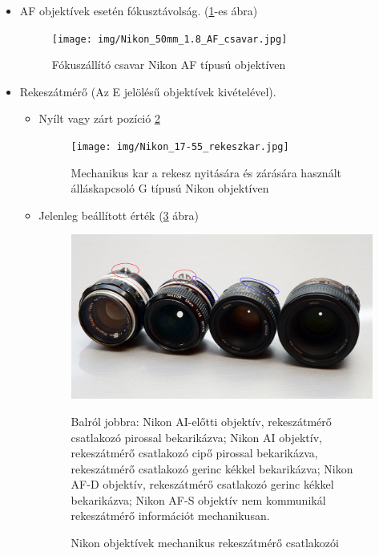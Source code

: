 \begin{itemize}
    \item AF objektívek esetén fókusztávolság. (\ref{fig:AF_csavar}-es ábra)
    \begin{figure}[H]
    	\centering
    	\texttt{[image: img/Nikon\_50mm\_1.8\_AF\_csavar.jpg]}
    	\caption{Fókuszállító csavar Nikon AF típusú objektíven}
    	\label{fig:AF_csavar}
    \end{figure}
    \item Rekeszátmérő (Az E jelölésű objektívek kivételével).
    \begin{itemize}
        \item Nyílt vagy zárt pozíció \ref{fig:G_rekeszkar}
        \begin{figure}[H]
        	\centering
        	\texttt{[image: img/Nikon\_17-55\_rekeszkar.jpg]}
        	\caption{Mechanikus kar a rekesz nyitására és zárására használt álláskapcsoló G típusú Nikon objektíven}
        	\label{fig:G_rekeszkar}
        \end{figure}
        \item Jelenleg beállított érték (\ref{fig:Exposure_coupleing} ábra)
        \begin{figure}[H]
        	\centering
        	\includegraphics[width=0.75\linewidth]{img/lenses-AI-and-non-AI.jpg}
        	\caption{Nikon objektívek mechanikus rekeszátmérő csatlakozói \cite{Legacy_lenses}}
            \medskip
            \justify Balról jobbra: Nikon AI-előtti objektív, rekeszátmérő csatlakozó pirossal bekarikázva; Nikon AI objektív,  rekeszátmérő csatlakozó cipő pirossal bekarikázva, rekeszátmérő csatlakozó gerinc kékkel bekarikázva; Nikon AF-D objektív, rekeszátmérő csatlakozó gerinc kékkel bekarikázva; Nikon AF-S objektív nem kommunikál rekeszátmérő információt mechanikusan.\cite{Legacy_lenses}
        	\label{fig:Exposure_coupleing}
        \end{figure}
    \end{itemize}
\end{itemize}

